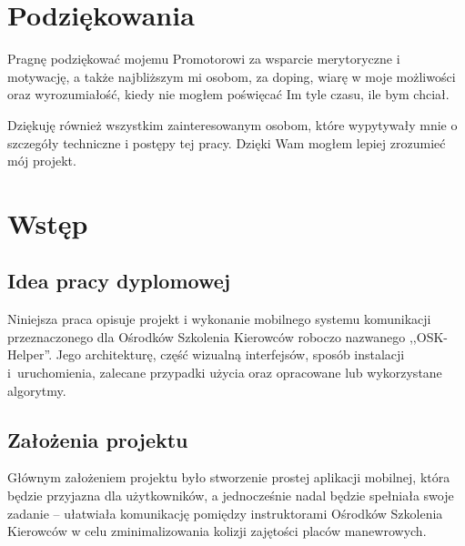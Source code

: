 \documentclass[twoside,a4paper,openright,12pt]{book}
\begin{document}



\frontmatter

\chapter*{Podziękowania}

Pragnę podziękować mojemu Promotorowi za wsparcie merytoryczne i motywację, a także najbliższym mi osobom, za doping, wiarę w moje możliwości oraz wyrozumiałość, kiedy nie mogłem poświęcać Im tyle czasu, ile bym chciał.

Dziękuję również wszystkim zainteresowanym osobom, które wypytywały mnie o szczegóły techniczne i postępy tej pracy. Dzięki Wam mogłem lepiej zrozumieć mój projekt.

\tableofcontents


\mainmatter

\chapter{Wstęp}
\section{Idea pracy dyplomowej}

Niniejsza praca opisuje projekt i wykonanie mobilnego systemu komunikacji przeznaczonego dla Ośrodków Szkolenia Kierowców roboczo nazwanego ,,OSK-Helper''. Jego architekturę, część wizualną interfejsów, sposób instalacji i~uruchomienia, zalecane przypadki użycia oraz opracowane lub wykorzystane algorytmy.


\section{Założenia projektu}

Głównym założeniem projektu było stworzenie prostej aplikacji mobilnej, która będzie przyjazna dla użytkowników, a jednocześnie nadal będzie spełniała swoje zadanie -- ułatwiała komunikację pomiędzy instruktorami Ośrodków Szkolenia Kierowców w celu zminimalizowania kolizji zajętości placów manewrowych.
\end{document}
